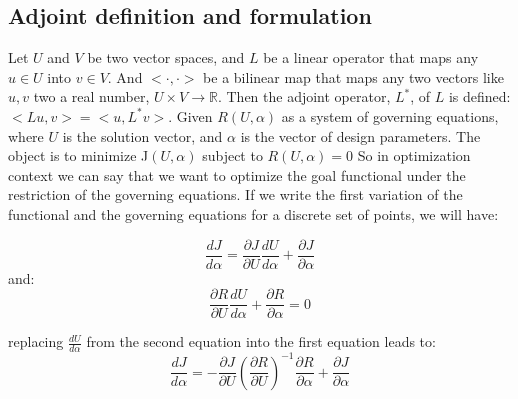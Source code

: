 \documentclass[a4paper,10pt]{article}
\begin{document}
\subsection{Adjoint definition and formulation}
Let $U$ and $V$ be two vector spaces, and $L$ be a linear operator that maps any $u \in U$ into $v \in V$.
And $<\cdot,\cdot>$ be a bilinear map that maps any two vectors like $u,v$ two a real number, $U \times V \rightarrow  \mathbb{R} $.
Then the adjoint operator, $L^*$, of $L$ is defined:$<Lu,v> = <u,L^*v>$.\newline
Given $R(U,\alpha)$ as a system of governing equations, where $U$ is the solution vector, and $\alpha$ 
is the vector of design parameters.\newline 
The object is to minimize \hspace{.05 in} J$(U,\alpha)$ \hspace{.1 in} subject to \hspace{.1 in} $R(U,\alpha)=0$\newline
So in optimization context we can say that we want to optimize the goal functional under the restriction of the governing equations.
If we write the first variation of the functional and the governing equations for a discrete set of points, we will have:
       
 \begin{equation}
 \frac{dJ}{d \alpha} = \frac{\partial J}{\partial U} \frac{d U}{d \alpha} + \frac{\partial J}{\partial \alpha} 
 \end{equation}
and:
  \begin{equation}
 \frac{\partial R}{\partial U} \frac{d U}{d \alpha} + \frac{\partial R}{\partial \alpha} = 0
 \end{equation}
 
 replacing $\frac{d U}{d \alpha}$ from the second equation into the first equation leads to:
  \begin{equation}
      \label{disadj}
 \frac{dJ}{d \alpha} = - \frac{\partial J}{\partial U} (\frac{\partial R}{\partial U})^{-1} \frac{\partial R}{\partial \alpha}  
+ \frac{\partial J}{\partial \alpha}
 \end{equation} 
\end{document}
